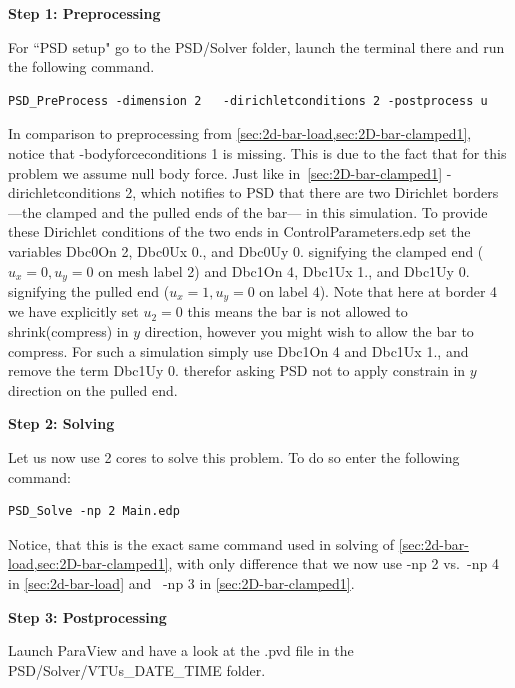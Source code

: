 \documentclass{report}
\begin{document}
\textbf{Step 1: Preprocessing}

For ``PSD setup" go to the {\ttfamily PSD/Solver} folder, launch the terminal there and run the following command.
\begin{lstlisting}[style=Linux]
PSD_PreProcess -dimension 2   -dirichletconditions 2 -postprocess u
\end{lstlisting}
%
In comparison to preprocessing from \cref{sec:2d-bar-load,sec:2D-bar-clamped1}, notice that {\ttfamily -bodyforceconditions 1} is missing. This is due to the fact that for this problem we assume null body force. Just like in~\cref{sec:2D-bar-clamped1} {\ttfamily -dirichletconditions 2}, which notifies to PSD that there are two Dirichlet borders ---the clamped and the pulled ends of the bar--- in this simulation.
To provide these Dirichlet conditions of the two ends in {\ttfamily ControlParameters.edp} set the variables  {\ttfamily Dbc0On 2}, {\ttfamily Dbc0Ux 0.}, and {\ttfamily Dbc0Uy 0.} signifying the clamped end ($u_x=0,u_y=0$ on mesh label 2) and {\ttfamily Dbc1On 4}, {\ttfamily Dbc1Ux 1.}, and {\ttfamily Dbc1Uy 0.} signifying the pulled end ($u_x=1,u_y=0$  on label 4). Note that here at border 4 we have explicitly set $u_2=0$ this means the bar is not allowed to shrink(compress) in $y$ direction, however you might wish to allow the bar to compress. For such a simulation simply use {\ttfamily Dbc1On 4} and {\ttfamily Dbc1Ux 1.}, and remove the term {\ttfamily Dbc1Uy 0.} therefor asking PSD not to apply constrain in $y$ direction on the pulled end.

\textbf{Step 2: Solving}

Let us now use 2 cores to solve this problem. To do so enter the following command:

\begin{lstlisting}[style=Linux]
PSD_Solve -np 2 Main.edp
\end{lstlisting}
%
Notice, that this is the exact same command used in solving of \cref{sec:2d-bar-load,sec:2D-bar-clamped1}, with only difference that we now use {\ttfamily -np 2} vs.~{\ttfamily -np 4} in \cref{sec:2d-bar-load} and ~{\ttfamily -np 3} in \cref{sec:2D-bar-clamped1}.


\textbf{Step 3: Postprocessing}

Launch ParaView and have a look at the  {\ttfamily .pvd} file in the  {\ttfamily PSD/Solver/VTUs\_DATE\_TIME} folder. 
\end{document}
